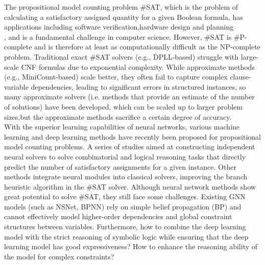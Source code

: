 The propositional model counting problem \#SAT, which is the problem of calculating a satisfactory assigned quantity 
for a given Boolean formula, has applications including software verification\cite{A1}\cite{A2},hardware design and 
planning\cite{B1}\cite{B2}\\ \cite{A3}, and is a fundamental challenge in computer science. However, \#SAT is \#P-complete 
and is therefore at least as computationally difficult as the NP-complete problem. Traditional exact \#SAT solvers 
(e.g., DPLL-based)\cite{A4}\cite{A5} struggle with large-scale CNF formulas due to exponential complexity. While approximate
methods (e.g., MiniCount-based)\cite{A6} scale better, they often fail to capture complex clause-variable dependencies,
leading to significant errors in structured instances, so many approximate solvers (i.e. methods that provide an estimate 
of the number of solutions) have been developed, which can be scaled up to larger problem sizes,but the approximate methods 
sacrifice a certain degree of accuracy.\\

With the superior learning capabilities of neural networks, various machine learning and deep learning methods have 
recently been proposed for propositional model counting problems\cite{A7}\cite{B3}\cite{B4}. A series of studies aimed at 
constructing independent neural solvers to solve combinatorial and logical reasoning tasks that directly predict the 
number of satisfactory assignments for a given instance\cite{A8}\cite{A9}. Other methods integrate neural modules into 
classical solvers, improving the branch heuristic algorithm in the \#SAT solver\cite{A10}. Although neural network methods 
show great potential to solve \#SAT, they still face some challenges. Existing GNN models (such as NSNet\cite{A11}, BPNN\cite{A12}) 
rely on simple belief propagation (BP) and cannot effectively model higher-order dependencies and global constraint 
structures between variables. Furthermore, how to combine the deep learning model with the strict reasoning of symbolic 
logic while ensuring that the deep learning model has good expressiveness?\cite{A12} How to enhance the reasoning 
ability of the model for complex constraints?\cite{A14}\\

